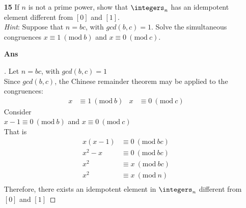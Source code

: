 \documentclass[paper=usletter, fontsize=12pt]{article}
\newcommand{\Mod}[1]{\ (\mathrm{mod}\ #1)}
\begin{document}
\begin{itemize}
\begin{itemize}
\begin{itemize}
\begin{proof}[\unskip\nopunct]
                \end{proof}
                \vspace{0.2in}

            \end{itemize}

            \item[\textbf{15}] If $n$ is not a prime power, show that
            $\integers_n$ has an idempotent element different from $[0]$ and
            $[1]$.\\ \textit{Hint}: Suppose that $n=bc$, with $gcd(b, c)=1$.
            Solve the simultaneous congruences $x \equiv 1 \Mod{b}$ and $x
            \equiv 0 \Mod{c}$.
            \item[\textbf{Ans}]
            \begin{proof}[\unskip\nopunct]
                Let $n=bc$, with $gcd(b, c)=1$\\
                Since $gcd(b,c)$, the Chinese remainder theorem may be applied to the congruences:
                \begin{align*}
                    x & \equiv 1 \Mod{b} & x & \equiv 0 \Mod{c}
                \end{align*}
                Consider\\
                $x - 1 \equiv 0 \Mod{b}$ and $x \equiv 0 \Mod{c}$\\
                That is
                \begin{align*}
                    x(x - 1) & \equiv 0 \Mod{bc}\\
                    x^2 - x & \equiv 0 \Mod{bc}\\
                    x^2 & \equiv x \Mod{bc}\\
                    x^2 & \equiv x \Mod{n}\\
                \end{align*}
                Therefore, there exists an idempotent element in $\integers_n$ different from $[0]$ and $[1]$ \qedhere
            \end{proof}
            \vspace{0.2in}


\end{itemize}
\end{itemize}
\end{document}
